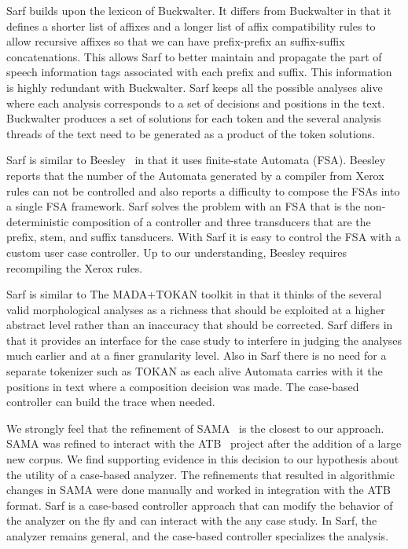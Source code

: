 \documentclass[11pt]{article}
\begin{document}
Sarf builds upon the lexicon of Buckwalter.
It differs from Buckwalter in that it defines a shorter list of affixes
and a longer list of affix compatibility rules to allow recursive 
affixes so that we can have prefix-prefix an suffix-suffix 
concatenations.
This allows Sarf to better maintain and propagate 
the part of speech information
tags associated with each prefix and suffix.
This information is highly 
redundant with Buckwalter.%
Sarf keeps all the possible analyses alive where each analysis
corresponds to a set of decisions and positions in the text. 
Buckwalter produces a set of solutions for each token 
and the several analysis threads of the text need to be 
generated as a product of the token solutions. 

Sarf is similar to Beesley~ in that it uses
finite-state Automata (FSA). 
Beesley reports that the number of the Automata generated by a compiler
from Xerox rules can not be controlled and also reports a difficulty to 
compose the FSAs into a single FSA framework. 
Sarf solves the problem with an FSA that is the non-deterministic 
composition of a controller and three
transducers that are the prefix, stem, and suffix tansducers. 
With Sarf it is easy to control the FSA with a custom user case 
controller. Up to our understanding, Beesley  
requires recompiling the Xerox rules.

Sarf is similar to The MADA+TOKAN toolkit in that it thinks of
the several valid morphological analyses as a richness that 
should be exploited at a higher abstract level rather than
an inaccuracy that should be corrected. 
Sarf differs in that it provides an interface for the 
case study to interfere in judging the analyses much earlier and
at a finer granularity level. 
Also in Sarf there is no need for a separate tokenizer such as
TOKAN as each alive Automata carries with it the positions in 
text where a composition decision was made. 
The case-based controller can build the trace 
when needed. 


We strongly feel that the refinement of SAMA~\cite{Maamouri:10} 
is the closest to our approach. SAMA was refined to interact with
the ATB~\cite{Maamouri:04} project after the addition of a large 
new corpus. We find supporting evidence in this decision to our hypothesis
about the utility of a case-based analyzer. 
The refinements that resulted in algorithmic changes in SAMA were 
done manually and worked in integration with the ATB format. 
Sarf is a case-based controller approach that can modify 
the behavior of the analyzer on the fly and can interact
with the any case study. In Sarf, the analyzer remains general, and the 
case-based controller specializes the analysis.
\end{document}
